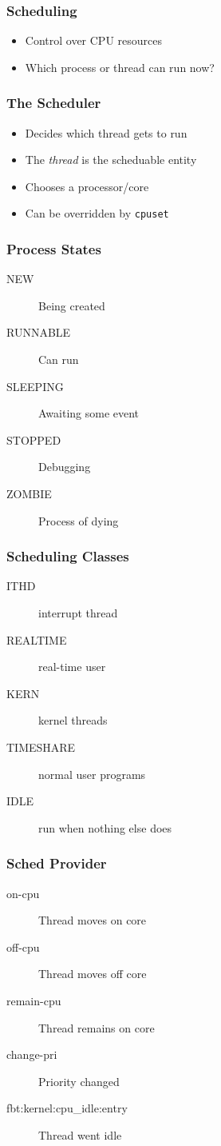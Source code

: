 \documentclass[pdftex]{beamer} %
\begin{document}
\begin{frame}
  \frametitle{Scheduling}
  \begin{itemize}
  \item Control over CPU resources
  \item Which process or thread can run now?
  \end{itemize}
\end{frame}

\begin{frame}[fragile]
  \frametitle{The Scheduler}
  \begin{itemize}
  \item Decides which thread gets to run
  \item The \emph{thread} is the scheduable entity
  \item Chooses a processor/core
  \item Can be overridden by \verb+cpuset+
  \end{itemize}
\end{frame}

\begin{frame}
  \frametitle{Process States}
  \begin{description}
  \item[NEW] Being created
  \item[RUNNABLE] Can run
  \item[SLEEPING] Awaiting some event
  \item[STOPPED] Debugging
  \item[ZOMBIE] Process of dying
  \end{description}
\end{frame}

\begin{frame}
  \frametitle{Scheduling Classes}
  \begin{description}
  \item[ITHD] interrupt thread
  \item[REALTIME] real-time user
  \item[KERN] kernel threads
  \item[TIMESHARE] normal user programs
  \item[IDLE] run when nothing else does
  \end{description}
\end{frame}

\begin{frame}[fragile]
  \frametitle{Sched Provider}
  \begin{description}
  \item[on-cpu] Thread moves on core
  \item[off-cpu] Thread moves off core
  \item[remain-cpu] Thread remains on core
  \item[change-pri] Priority changed
  \item[fbt:kernel:cpu\_idle:entry] Thread went idle
  \end{description}
\end{frame}
\end{document}
